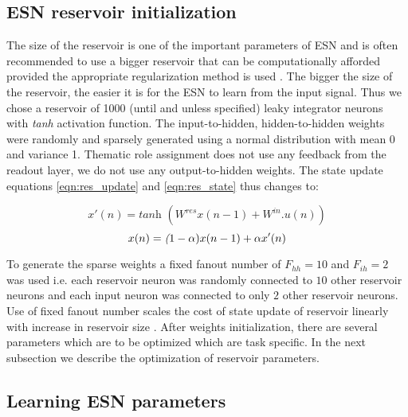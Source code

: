 \subsection{ESN reservoir initialization}

The size of the reservoir is one of the important parameters of ESN and is often recommended to use a bigger reservoir that can be computationally afforded provided the appropriate regularization method is used \cite{esn:practical_guide}. The bigger the size of the reservoir, the easier it is for the ESN to learn from the input signal. Thus we chose a reservoir of 1000 (until and unless specified) leaky integrator neurons with \textit{tanh} activation function. The input-to-hidden, hidden-to-hidden weights were randomly and sparsely generated using a normal distribution with mean 0 and variance 1. Thematic role assignment does not use any feedback from the readout layer, we do not use any output-to-hidden weights. The state update equations \ref{eqn:res_update} and \ref{eqn:res_state} thus changes to:

\begin{equation} \label{eqn:res_new_update}
x'(n) =\textit {tanh } ( W^{res}x(n-1) + W^{in}.u(n))
\end{equation}
\begin{equation} \label{eqn:res_new_state}
x(n) =\textit (1-\alpha) x(n-1) + \alpha x'(n)
\end{equation}

To generate the sparse weights a fixed fanout number of $F_{hh} = 10$ and $F_{ih} = 2$ was used i.e. each reservoir neuron was randomly connected to $10$ other reservoir neurons and each input neuron was connected to only $2$ other reservoir neurons. Use of fixed fanout number scales the cost of state update of reservoir linearly with increase in reservoir size \cite{esn:practical_guide}. After weights initialization, there are several parameters which are to be optimized which are task specific. In the next subsection we describe the optimization of reservoir parameters.

\subsection{Learning ESN parameters} \label{grid_search}

